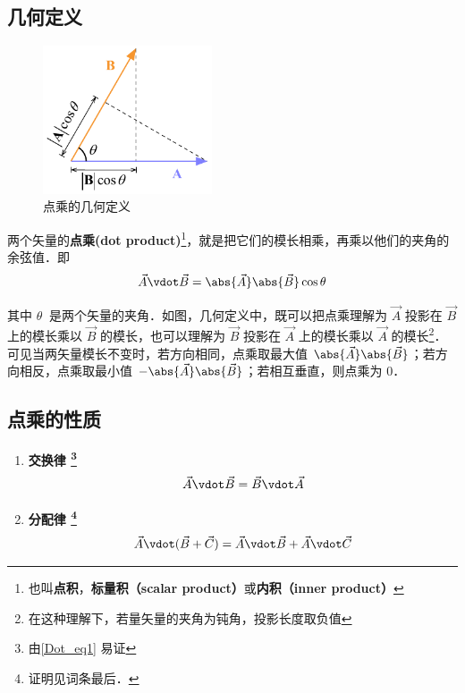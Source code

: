
\subsection{几何定义}
\begin{figure}[th]
\centering
\includegraphics[width=5cm]{./figures/Dot1.pdf}
\caption{点乘的几何定义}
\end{figure}
两个矢量的\textbf{点乘(dot product)}\footnote{也叫\textbf{点积}，\textbf{标量积（scalar product）}或\textbf{内积（inner product）}}，就是把它们的模长相乘，再乘以他们的夹角的余弦值．即
\begin{equation}\label{Dot_eq1}
\vec A \vdot \vec B = \abs{\vec A} \abs{\vec B} \cos\theta 
\end{equation}

其中 $\theta \ $ 是两个矢量的夹角．如图，几何定义中，既可以把点乘理解为 $\vec A$ 投影在 $\vec B$ 上的模长乘以 $\vec B$ 的模长，也可以理解为 $\vec B$ 投影在 $\vec A$ 上的模长乘以 $\vec A$ 的模长\footnote{在这种理解下，若量矢量的夹角为钝角，投影长度取负值}．可见当两矢量模长不变时，若方向相同，点乘取最大值 $\abs{\vec A}\abs{\vec B}$；若方向相反，点乘取最小值 $-\abs{\vec A}\abs{\vec B}$；若相互垂直，则点乘为 0．

\subsection{点乘的性质} %

\begin{enumerate}
\item \textbf{交换律 \footnote{由\autoref{Dot_eq1} 易证}}
\begin{equation} \vec A \vdot \vec B = \vec B \vdot \vec A \end{equation}

\item \textbf{分配律 \footnote{证明见词条最后．}}
\begin{equation}\label{Dot_eq3}
\vec A \vdot (\vec B + \vec C) = \vec A \vdot \vec B + \vec A \vdot \vec C
\end{equation}
\end{enumerate}

